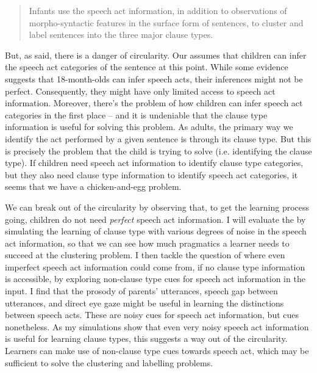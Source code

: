 {\begin{quote}
Infants use the speech act information, in addition to observations of morpho-syntactic features in the surface form of sentences, to cluster and label sentences into the three major clause types.
\end{quote}



But, as said, there is a danger of circularity.
Our \hypos{} assumes that children can infer the speech act categories of the sentence at this point. While some evidence suggests that 18-month-olds can infer speech acts, their inferences might not be perfect. Consequently, they might have only limited access to speech act information. Moreover, there's the problem of how children can infer speech act categories in the first place -- and it is undeniable that the clause type information is useful for solving this problem. As adults, the primary way we identify the act performed by a given sentence is through its clause type. But this is precisely the problem that the child is trying to solve (i.e. identifying the clause type). If children need speech act information to identify clause type categories, but they also need clause type information to identify speech act categories, it seems that we have a chicken-and-egg problem. 

We can break out of the circularity by observing that, to get the learning process going, children do not need \emph{perfect} speech act information. I will evaluate the \hypos{} by 
simulating the learning of clause type with various degrees of noise in the speech act information, so that we can see how much pragmatics a learner needs to succeed at the clustering problem. I then tackle the question of where even imperfect speech act information could come from, if no clause type information is accessible,
by exploring non-clause type cues for speech act information in the input. I find that the prosody of parents' utterances, speech gap between utterances, and direct eye gaze might be useful in learning the distinctions between speech acts.
These are noisy cues for speech act information, but cues nonetheless. As my simulations show that even very noisy speech act information is useful for learning clause types, this suggests a way out of the circularity. Learners can make use of non-clause type cues towards speech act, which may be sufficient to solve the clustering and labelling problems.

}
